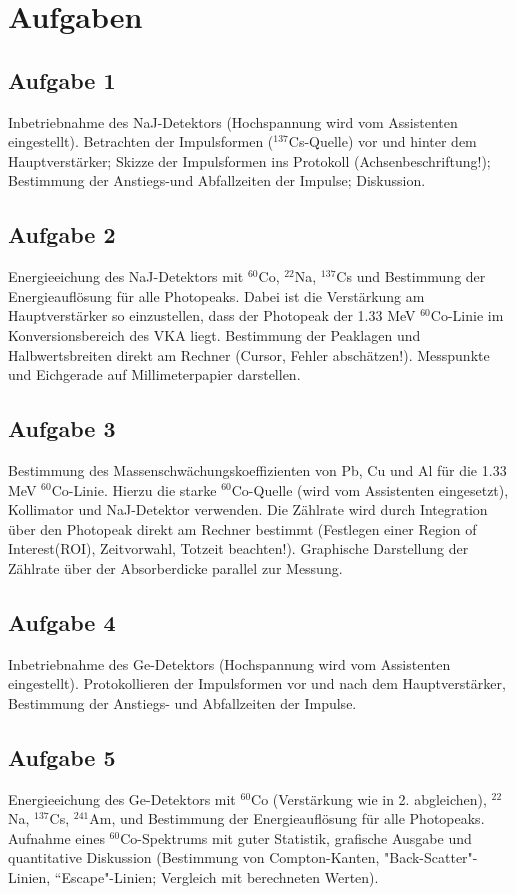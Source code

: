 \section{Aufgaben}
\subsection*{Aufgabe 1}
Inbetriebnahme des NaJ-Detektors (Hochspannung wird vom Assistenten eingestellt). Betrachten der Impulsformen ($^{137}$Cs-Quelle) vor und hinter dem Hauptverstärker; Skizze der Impulsformen ins Protokoll (Achsenbeschriftung!); Bestimmung der Anstiegs-und Abfallzeiten der Impulse; Diskussion.

\subsection*{Aufgabe 2}
Energieeichung des NaJ-Detektors mit $^{60}$Co, $^{22}$Na, $^{137}$Cs und Bestimmung der Energieauflösung für alle Photopeaks. Dabei ist die Verstärkung am Hauptverstärker so einzustellen, dass der Photopeak der 1.33 MeV $^{60}$Co-Linie im Konversionsbereich des VKA liegt. Bestimmung der Peaklagen und Halbwertsbreiten direkt am Rechner (Cursor, Fehler 
abschätzen!). Messpunkte und Eichgerade auf Millimeterpapier darstellen. 

\subsection*{Aufgabe 3}
Bestimmung des Massenschwächungskoeffizienten von Pb, Cu und Al für die 1.33 MeV $^{60}$Co-Linie. Hierzu die starke $^{60}$Co-Quelle (wird vom Assistenten eingesetzt), Kollimator und NaJ-Detektor verwenden. Die Zählrate wird durch Integration über den Photopeak direkt am Rechner bestimmt (Festlegen einer Region of Interest(ROI), Zeitvorwahl, Totzeit 
beachten!). Graphische Darstellung der Zählrate über der Absorberdicke parallel zur Messung. 

\subsection*{Aufgabe 4}
Inbetriebnahme des Ge-Detektors (Hochspannung wird vom Assistenten eingestellt). Protokollieren der Impulsformen vor und nach dem Hauptverstärker, Bestimmung der Anstiegs- und Abfallzeiten der Impulse.

\subsection*{Aufgabe 5}
Energieeichung des Ge-Detektors mit $^{60}$Co (Verstärkung wie in 2. abgleichen), $^{22}$Na, $^{137}$Cs, $^{241}$Am, und Bestimmung der Energieauflösung für alle Photopeaks. Aufnahme eines $^{60}$Co-Spektrums mit guter Statistik, grafische Ausgabe und quantitative Diskussion 
(Bestimmung von Compton-Kanten, "Back-Scatter"-Linien, “Escape"-Linien; Vergleich mit berechneten Werten). 

